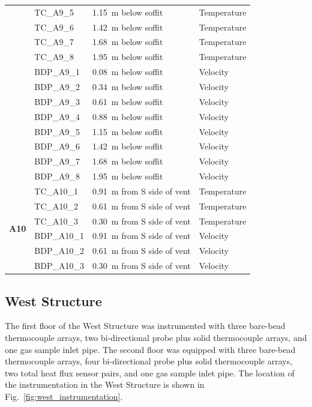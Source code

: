 \documentclass[12pt,oneside]{book}
\begin{document}
\begin{longtable}[c]{c|lll}
 & TC\_A9\_5  & 1.15~m below soffit  & Temperature \\
 & TC\_A9\_6  & 1.42~m below soffit  & Temperature \\
 & TC\_A9\_7  & 1.68~m below soffit  & Temperature \\
 & TC\_A9\_8  & 1.95~m below soffit  & Temperature \\
\cline{2-4}
 & BDP\_A9\_1 & 0.08~m below soffit  & Velocity \\
 & BDP\_A9\_2 & 0.34~m below soffit  & Velocity \\
 & BDP\_A9\_3 & 0.61~m below soffit  & Velocity \\
 & BDP\_A9\_4 & 0.88~m below soffit  & Velocity \\
 & BDP\_A9\_5 & 1.15~m below soffit  & Velocity \\
 & BDP\_A9\_6 & 1.42~m below soffit  & Velocity \\
 & BDP\_A9\_7 & 1.68~m below soffit  & Velocity \\
 & BDP\_A9\_8 & 1.95~m below soffit  & Velocity \\
\midrule
\multirow{6}{*}{\large{\textbf{A10}}}
 & TC\_A10\_1 & 0.91~m from S side of vent & Temperature \\
 & TC\_A10\_2 & 0.61~m from S side of vent & Temperature \\
 & TC\_A10\_3 & 0.30~m from S side of vent & Temperature \\
\cline{2-4}
 & BDP\_A10\_1 & 0.91~m from S side of vent & Velocity \\
 & BDP\_A10\_2 & 0.61~m from S side of vent & Velocity \\
 & BDP\_A10\_3 & 0.30~m from S side of vent & Velocity \\
\bottomrule
\end{longtable}
\clearpage

\subsection{West Structure}
The first floor of the West Structure was instrumented with three bare-bead thermocouple arrays, two bi-directional probe plus solid thermocouple arrays, and one gas sample inlet pipe. The second floor was equipped with three bare-bead thermocouple arrays, four bi-directional probe plus solid thermocouple arrays, two total heat flux sensor pairs, and one gas sample inlet pipe. The location of the instrumentation in the West Structure is shown in Fig.~\ref{fig:west_instrumentation}.
\end{document}
